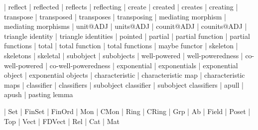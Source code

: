     |   reflect
    |   reflected
    |   reflects
    |   reflecting
    |   create
    |   created
    |   creates
    |   creating
    |   transpose
    |   transposed
    |   transposes
    |   transposing
    |   mediating morphism
    |   mediating morphisms
    |   unit@ADJ
    |   units@ADJ  
    |   counit@ADJ
    |   counits@ADJ
    |   triangle identity
    |   triangle identities
    |   pointed
    |   partial
    |   partial function
    |   partial functions
    |   total
    |   total function
    |   total functions
    |   maybe functor
    |   skeleton
    |   skeletons
    |   skeletal
    |   subobject
    |   subobjects
    |   well-powered
    |   well-poweredness
    |   co-well-powered
    |   co-well-poweredness
    |   exponential
    |   exponentials
    |   exponential object
    |   exponential objects
    |   characteristic
    |   characteristic map
    |   characteristic maps
    |   classifier
    |   classifiers
    |   subobject classifier
    |   subobject classifiers
    |   apull
    |   apush
    |   pasting lemma

    |   Set
    |   FinSet
    |   FinOrd
    |   Mon
    |   CMon
    |   Ring
    |   CRing
    |   Grp
    |   Ab
    |   Field
    |   Poset
    |   Top
    |   Vect
    |   FDVect
    |   Rel
    |   Cat
    |   Mat
